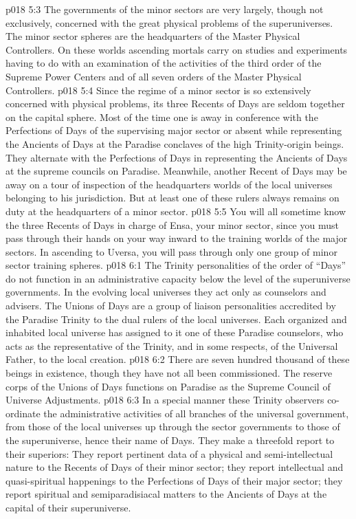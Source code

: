 \vs p018 5:3 The governments of the minor sectors are very largely, though not exclusively, concerned with the great physical problems of the superuniverses. The minor sector spheres are the headquarters of the Master Physical Controllers. On these worlds ascending mortals carry on studies and experiments having to do with an examination of the activities of the third order of the Supreme Power Centers and of all seven orders of the Master Physical Controllers.
\vs p018 5:4 Since the regime of a minor sector is so extensively concerned with physical problems, its three Recents of Days are seldom together on the capital sphere. Most of the time one is away in conference with the Perfections of Days of the supervising major sector or absent while representing the Ancients of Days at the Paradise conclaves of the high Trinity\hyp{}origin beings. They alternate with the Perfections of Days in representing the Ancients of Days at the supreme councils on Paradise. Meanwhile, another Recent of Days may be away on a tour of inspection of the headquarters worlds of the local universes belonging to his jurisdiction. But at least one of these rulers always remains on duty at the headquarters of a minor sector.\plusone
\vs p018 5:5 You will all sometime know the three Recents of Days in charge of Ensa, your minor sector, since you must pass through their hands on your way inward to the training worlds of the major sectors. In ascending to Uversa, you will pass through only one group of minor sector training spheres.
\vs p018 6:1 The Trinity personalities of the order of “Days” do not function in an administrative capacity below the level of the superuniverse governments. In the evolving local universes they act only as counselors and advisers. The Unions of Days are a group of liaison personalities accredited by the Paradise Trinity to the dual rulers of the local universes. Each organized and inhabited local universe has assigned to it one of these Paradise counselors, who acts as the representative of the Trinity, and in some respects, of the Universal Father, to the local creation.
\vs p018 6:2 There are seven hundred thousand of these beings in existence, though they have not all been commissioned. The reserve corps of the Unions of Days functions on Paradise as the Supreme Council of Universe Adjustments.
\vs p018 6:3 In a special manner these Trinity observers co\hyp{}ordinate the administrative activities of all branches of the universal government, from those of the local universes up through the sector governments to those of the superuniverse, hence their name of Days. They make a threefold report to their superiors: They report pertinent data of a physical and semi\hyp{}intellectual nature to the Recents of Days of their minor sector; they report intellectual and quasi\hyp{}spiritual happenings to the Perfections of Days of their major sector; they report spiritual and semiparadisiacal matters to the Ancients of Days at the capital of their superuniverse.
